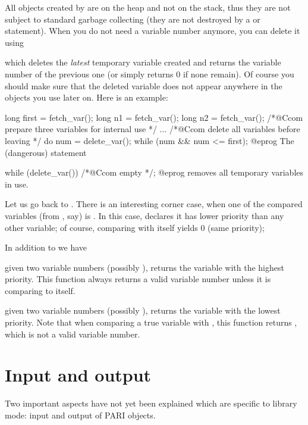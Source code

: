 All objects created by  are on the heap and not on the stack,
thus they are not subject to standard garbage collecting (they are not
destroyed by a  or  statement).
When you do not need a variable number anymore, you can delete it using


\noindent which deletes the \emph{latest} temporary variable created and
returns the variable number of the previous one (or simply returns 0 if none
remain). Of course you should make sure that
the deleted variable does not appear anywhere in the objects you use later
on. Here is an example:

\bprog
  long first = fetch_var();
  long n1 = fetch_var();
  long n2 = fetch_var(); /*@Ccom prepare three variables for internal use */
  ...
  /*@Ccom delete all variables before leaving */
  do { num = delete_var(); } while (num && num <= first);
@eprog\noindent
The (dangerous) statement

\bprog
  while (delete_var()) /*@Ccom empty */;
@eprog\noindent
removes all temporary variables in use.


Let us go back to . There is an interesting corner case, when
one of the compared variables (from , say) is .
In this case,  declares it has lower priority than any other
variable; of course, comparing  with itself yields
$0$ (same priority);

In addition to  we have

 given two variable numbers (possibly
), returns the variable with the highest priority.
This function always returns a valid variable number unless it is comparing
 to itself.

 given two variable numbers (possibly
), returns the variable with the lowest priority. Note
that when comparing a true variable with , this function
returns , which is not a valid variable number.

\section{Input and output}

\noindent
Two important aspects have not yet been explained which are specific to
library mode: input and output of PARI objects.

